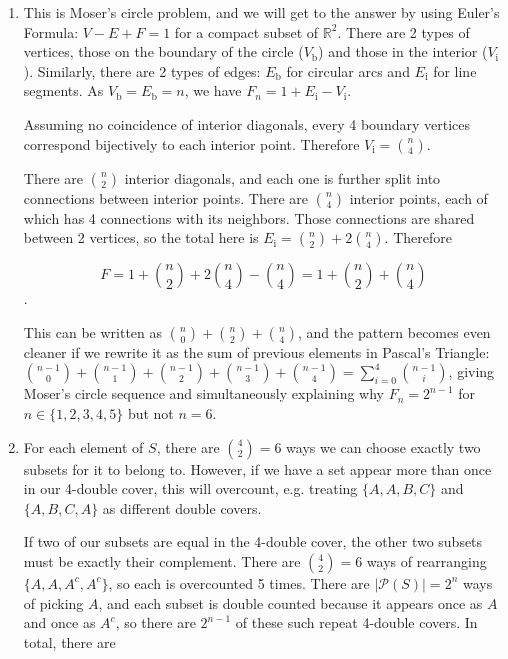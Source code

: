 \documentclass{book}
\numberwithin{equation}{section}
\begin{document}
\begin{enumerate}[label={9.\arabic*}]
\item
This is Moser's circle problem, and we will get to the answer by using Euler's Formula: $V - E + F = 1$ for a
compact subset of $\mathbb{R}^2$. There are 2 types of vertices, those on the boundary of the circle ($V_{\text{b}}$)
and those in the interior ($V_{\text{i}}$). Similarly, there are 2 types of edges: $E_{\text{b}}$ for circular arcs
and $E_{\text{i}}$ for line segments.
As $V_{\text{b}} = E_{\text{b}} = n$, we have $F_n = 1 + E_{\text{i}} - V_{\text{i}}$.

Assuming no coincidence of interior diagonals, every 4 boundary vertices correspond bijectively to each interior
point. Therefore $V_{\text{i}} = {n \choose 4}$.

There are ${n \choose 2}$ interior diagonals, and each one is further split into connections between interior points.
There are ${n \choose 4}$ interior points, each of which has 4 connections with its neighbors. Those connections
are shared between 2 vertices, so the total here is $E_{\text{i}} = {n \choose 2} + 2{n \choose 4}$. Therefore

$$F = 1 + {n \choose 2} + 2{n \choose 4} - {n \choose 4} = 1 + {n \choose 2} + {n \choose 4}$$.

This can be written as ${n \choose 0} + {n \choose 2} + {n \choose 4}$, and the pattern becomes even cleaner
if we rewrite it as the sum of previous elements in Pascal's Triangle: ${n-1 \choose 0} + {n-1 \choose 1} + {n-1 \choose 2}
+ {n-1 \choose 3} + {n-1 \choose 4} = \sum_{i=0}^4 {n-1 \choose i}$, giving Moser's circle sequence and simultaneously
explaining why $F_n = 2^{n-1}$ for \\ $n \in \{1, 2, 3, 4, 5\}$ but not $n = 6$.

\item
For each element of $S$, there are ${4 \choose 2} = 6$ ways we can choose exactly two subsets for it to belong to.
However, if we have a set appear more than once in our 4-double cover, this will overcount, e.g. treating $\{A, A, B, C\}$
and $\{A, B, C, A\}$ as different double covers.

If two of our subsets are equal in the 4-double cover, the other two subsets must be exactly their complement.
There are ${4 \choose 2} = 6$ ways of rearranging $\{A, A, A^c, A^c\}$, so each is overcounted 5 times. There are
$|\mathcal{P}(S)| = 2^n$ ways of picking $A$, and each subset is double counted because it appears once as $A$ and once as $A^c$,
so there are $2^{n-1}$ of these such repeat 4-double covers. In total, there are


\end{enumerate}
\end{document}
